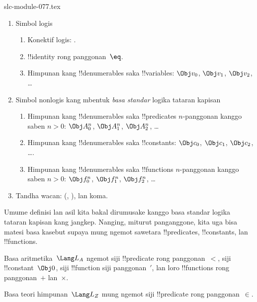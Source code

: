 \begin{filecontents*}[overwrite]{slc-module-077.tex}
\begin{enumerate}
\item Simbol logis
\begin{enumerate}
\item Konektif logis:
  \startycommalist
  .
\item !!{identity} rong panggonan~$\eq$.
\item Himpunan kang !!{denumerable}s saka !!{variable}s: $\Obj v_0$, $\Obj v_1$, $\Obj
  v_2$, \dots
\end{enumerate}
\item Simbol nonlogis kang mbentuk \emph{basa standar} logika tataran
  kapisan
\begin{enumerate}
\item Himpunan kang !!{denumerable}s saka !!{predicate}s $n$-panggonan
  kanggo saben $n>0$: $\Obj
  A^n_0$, $\Obj A^n_1$, $\Obj A^n_2$, \dots
\item Himpunan kang !!{denumerable}s saka !!{constant}s: $\Obj c_0$, $\Obj c_1$, $\Obj
  c_2$, \dots.
\item Himpunan kang !!{denumerable}s saka !!{function}s $n$-panggonan
  kanggo saben $n>0$:
  $\Obj f^n_0$, $\Obj f^n_1$, $\Obj f^n_2$, \dots
\end{enumerate}
\item Tandha wacan: (, ), lan koma.
\end{enumerate}

Umume definisi lan asil kita bakal dirumusake kanggo basa standar
logika tataran kapisan kang jangkep. Nanging, miturut panganggone, kita uga
bisa matesi basa kasebut supaya mung ngemot sawetara !!{predicate}s,
!!{constant}s, lan !!{function}s.

\begin{ex}
Basa aritmetika~$\Lang L_A$ ngemot siji !!{predicate} rong panggonan~$<$,
siji !!{constant}~$\Obj 0$, siji !!{function} siji panggonan~$\prime$,
lan loro !!{function}s rong panggonan~$+$ lan~$\times$.
\end{ex}

\begin{ex}
Basa teori himpunan~$\Lang L_Z$ mung ngemot siji !!{predicate} rong
panggonan~$\in$.
\end{ex}


\end{filecontents*}
